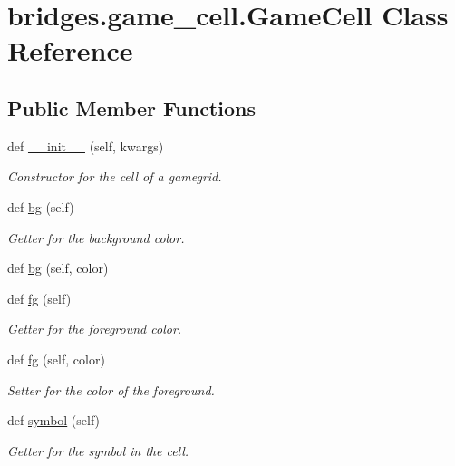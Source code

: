 \hypertarget{classbridges_1_1game__cell_1_1_game_cell}{}\section{bridges.\+game\+\_\+cell.\+Game\+Cell Class Reference}
\label{classbridges_1_1game__cell_1_1_game_cell}
\subsection*{Public Member Functions}
\begin{DoxyCompactItemize}
\item 
def \mbox{\hyperlink{classbridges_1_1game__cell_1_1_game_cell_a5f604c05c0d42179a09ace913302d57b}{\+\_\+\+\_\+init\+\_\+\+\_\+}} (self, kwargs)
\begin{DoxyCompactList}\small\item\em Constructor for the cell of a gamegrid. \end{DoxyCompactList}\item 
def \mbox{\hyperlink{classbridges_1_1game__cell_1_1_game_cell_a64581c2fd4a7c1da8e302ba9f843aae4}{bg}} (self)
\begin{DoxyCompactList}\small\item\em Getter for the background color. \end{DoxyCompactList}\item 
def \mbox{\hyperlink{classbridges_1_1game__cell_1_1_game_cell_ac500927058f98ad319821d5c89c91246}{bg}} (self, color)
\item 
def \mbox{\hyperlink{classbridges_1_1game__cell_1_1_game_cell_a351a23a7e0c4a8b026ab95bff6c05e35}{fg}} (self)
\begin{DoxyCompactList}\small\item\em Getter for the foreground color. \end{DoxyCompactList}\item 
def \mbox{\hyperlink{classbridges_1_1game__cell_1_1_game_cell_ae49f154ef62b58e70c06b6a1da230acc}{fg}} (self, color)
\begin{DoxyCompactList}\small\item\em Setter for the color of the foreground. \end{DoxyCompactList}\item 
def \mbox{\hyperlink{classbridges_1_1game__cell_1_1_game_cell_adc1c02a52845c2673d43167212574904}{symbol}} (self)
\begin{DoxyCompactList}\small\item\em Getter for the symbol in the cell. \end{DoxyCompactList}\item 

\end{DoxyCompactItemize}
